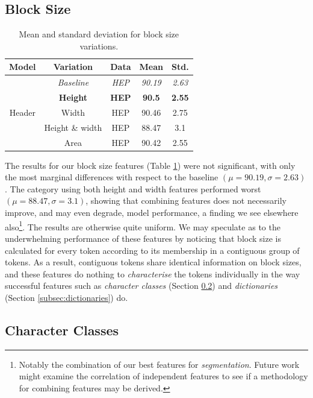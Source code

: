 \subsection{Block Size}

\begin{table}[h]
\begin{center}
\begin{tabular}{|c|c|c|c|c|}
\hline
Model & Variation & Data & Mean & Std.\\
\hline
\multirow{5}{*}{Header} & \emph{Baseline} & \emph{HEP} & \emph{90.19} & \emph{2.63} \\\cline{2-5}
& \textbf{Height} & \textbf{HEP} & \textbf{90.5} & \textbf{2.55}\\\cline{2-5}
& Width & HEP & 90.46 & 2.75\\\cline{2-5}
& Height \& width & HEP  & 88.47 & 3.1\\\cline{2-5}
& Area & HEP  & 90.42 & 2.55\\\cline{2-5}
\hline
\end{tabular}
\caption{Mean and standard deviation for block size variations.}
\label{table:blockshaperesults}
\end{center}
\end{table}

The results for our block size features (Table \ref{table:blockshaperesults}) were not significant, with only the most marginal differences with respect to the baseline $(\mu = 90.19, \sigma = 2.63)$. The category using both height and width features performed worst $(\mu = 88.47, \sigma = 3.1)$, showing that combining features does not necessarily improve, and may even degrade, model performance, a finding we see elsewhere also\footnote{Notably the combination of our best features for \emph{segmentation}. Future work might examine the correlation of independent features to see if a methodology for combining features may be derived.}. The results are otherwise quite uniform. We may speculate as to the underwhelming performance of these features by noticing that block size is calculated for every token according to its membership in a contiguous group of tokens. As a result, contiguous tokens share identical information on block sizes, and these features do nothing to \emph{characterise} the tokens individually in the way successful features such as \emph{character classes} (Section \ref{subsec:characterclassresults}) and  \emph{dictionaries} (Section \ref{subsec:dictionaries}) do.

\subsection{Character Classes}
\label{subsec:characterclassresults}

